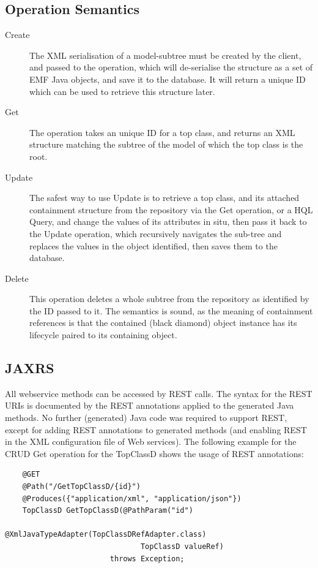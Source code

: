 \documentclass[11pt]{article}
\begin{document}
\subsection{Operation Semantics}

\begin{description}
\item[Create] The XML serialisation of a model-subtree must be created by the client, and passed to the operation, which will de-serialise the structure as a set of EMF Java objects, and save it to the database. It will return a unique ID which can be used to retrieve this structure later.
\item[Get] The operation takes an unique ID for a top class, and returns an XML structure matching the subtree of the model of which the top class is the root.
\item[Update] The safest way to use Update is to retrieve a top class, and its attached containment structure from the repository via the Get operation, or a HQL Query, and change the values of its attributes in situ, then pass it back to the Update operation, which recursively navigates the sub-tree and replaces the values in the object identified, then saves them to the database.
\item[Delete] This operation deletes a whole subtree from the repository as identified by the ID passed to it. The semantics is sound, as the meaning of containment references is that the contained (black diamond) object instance has its lifecycle paired to its containing object.
\end{description}

\subsection{JAXRS}

All webservice methods can be accessed by REST calls. The syntax for the REST URIs is documented by the REST annotations applied to the generated Java methods.
No further (generated) Java code was required to support REST, except for adding REST annotations to generated methods (and enabling REST in the XML configuration file of Web services).
The following example for the CRUD Get operation for the TopClassD shows the usage of REST annotations:

\begin{verbatim}
	@GET
	@Path("/GetTopClassD/{id}")
	@Produces({"application/xml", "application/json"})
	TopClassD GetTopClassD(@PathParam("id") 
	                          @XmlJavaTypeAdapter(TopClassDRefAdapter.class) 
	                           TopClassD valueRef) 
	                    throws Exception;
\end{verbatim}
\end{document}
